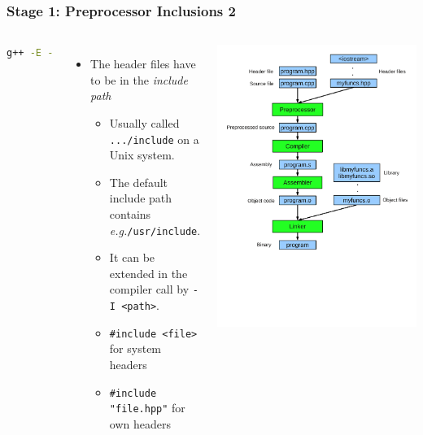 \documentclass{slides}
\newcommand{\eg}{\textit{e.\thinspace g.}\xspace}
\begin{document}
\begin{frame}[fragile]
  \frametitle{Stage 1: Preprocessor Inclusions 2}
  \begin{columns}[T,onlytextwidth]
    \begin{lstlisting}[language=bash]
g++ -E -I<path> <source>
    \end{lstlisting}
    
    \begin{itemize}
    \item The header files have to be in the \emph{include path}
      \begin{itemize}
      \item Usually called \texttt{.../include} on a Unix system.
      \item The default include path contains \eg \texttt{/usr/include}.
      \item It can be extended in the compiler call by \texttt{-I
          <path>}.
      \item \lstinline!#include <file>! for system headers
      \item \lstinline!#include "file.hpp"! for own headers
      \end{itemize}
    \end{itemize}

    \includegraphics[height=1.1\textheight]{compilation}
  \end{columns}
\end{frame}
\end{document}
